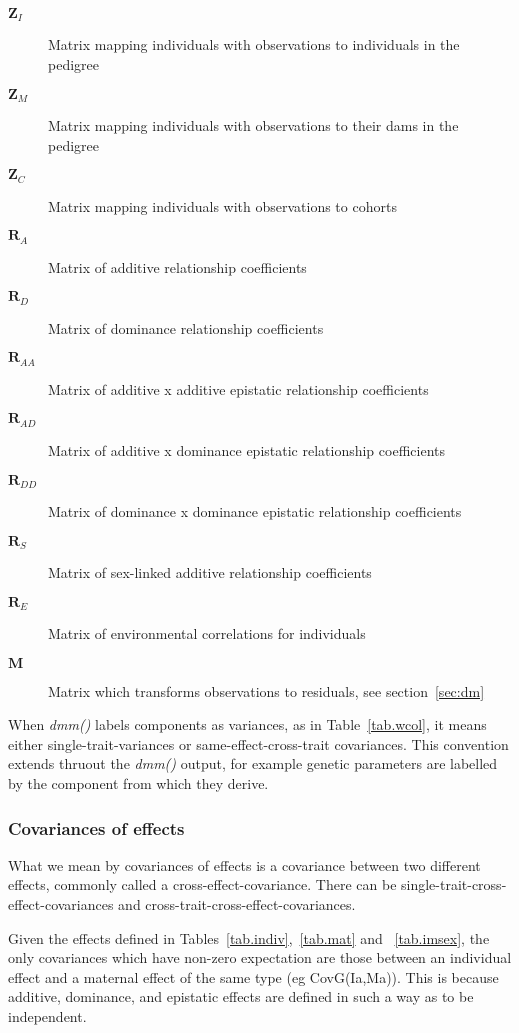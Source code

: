 \documentclass[titlepage]{article}  %
\begin{document}
\begin{description}
\item [${\bm Z_{I}}$] Matrix mapping individuals with observations to individuals in the pedigree
\item [${\bm Z_{M}}$] Matrix mapping individuals with observations to their dams in  the pedigree
\item [${\bm Z_{C}}$] Matrix mapping individuals with observations to cohorts
\item[${\bm R_{A}}$] Matrix of additive relationship coefficients
\item[${\bm R_{D}}$] Matrix of dominance relationship coefficients
\item[${\bm R_{AA}}$] Matrix of additive x additive epistatic relationship coefficients
\item[${\bm R_{AD}}$] Matrix of additive x dominance epistatic relationship coefficients
\item[${\bm R_{DD}}$] Matrix of dominance x dominance epistatic relationship coefficients
\item[${\bm R_{S}}$] Matrix of sex-linked  additive relationship coefficients
\item[${\bm R_{E}}$] Matrix of environmental correlations for individuals
\item[${\bm M}$] Matrix which transforms observations to residuals, see section~\ref{sec:dm}
\end{description}

When {\em dmm()} labels components as variances,  as in Table~\ref{tab.wcol}, it means either single-trait-variances or same-effect-cross-trait covariances. This convention extends thruout the {\em dmm()} output, for example genetic parameters are labelled by the component from which they derive.

\subsubsection{Covariances of effects}
What we mean by covariances of effects is a covariance between two different effects, commonly called a cross-effect-covariance. There can be single-trait-cross-effect-covariances and cross-trait-cross-effect-covariances. 

Given the effects defined in Tables~\ref{tab.indiv},~\ref{tab.mat} and ~\ref{tab.imsex}, the only covariances which have non-zero expectation are those between an individual effect and a maternal effect of the same type (eg CovG(Ia,Ma)). This is because additive, dominance, and epistatic effects are defined in such a way as to be independent.
\end{document}
